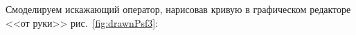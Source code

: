 Смоделируем искажающий оператор, нарисовав кривую в графическом редакторе <<от руки>> рис.~\ref{fig:drawnPsf3}:


